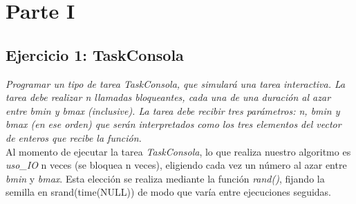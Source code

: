 \documentclass[a4paper]{article}
\begin{document}
\thispagestyle{empty}

\maketitle
\newpage

\thispagestyle{empty}
\vfill
\begin{abstract}
El presente trabajo aborda el desarrollo algorítmico de varios Schedulers, como así tambi\'en de tipos de tareas que deber\'an ejecutar. Se evaluar\'a el comportamiento de cada algoritmo para una serie de tareas dadas y, a su vez, c\'omo afecta dicho desarrollo si intervienen otros factores tales como modficaciones en el quantum o en la cantidad de n\'ucleos. Por \'ultimo,  compararemos el rendimiento de distintos Schedulers bajo diversas métricas. 
\end{abstract}


\thispagestyle{empty}
\vspace{3cm}
\tableofcontents
\newpage


\newpage
\section{Parte I}

\subsection{Ejercicio 1: TaskConsola}
\textit{Programar un tipo de tarea TaskConsola, que simular\'a una tarea interactiva. La tarea debe realizar n llamadas bloqueantes, cada una de una duraci\'on al azar entre bmin y bmax (inclusive). La tarea debe recibir tres par\'ametros: n, bmin y bmax (en ese orden) que ser\'an interpretados como los tres elementos del vector de enteros que recibe la funci\'on.}\\

Al momento de ejecutar la tarea \emph{TaskConsola}, lo que realiza nuestro algoritmo es \emph{uso_IO} n veces (se bloquea n veces), eligiendo cada vez un n\'umero al azar entre \textit{bmin} y \textit{bmax}. Esta elecci\'on se realiza mediante la funci\'on \textit{rand()}, fijando la semilla en srand(time(NULL)) de modo que var\'ia entre ejecuciones seguidas.
\end{document}
